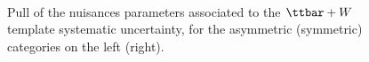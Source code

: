 \begin{figure}[tbhp]
    \caption{ Pull of the nuisances parameters associated to the $\ttbar+W$ template systematic uncertainty, 
      for the asymmetric (symmetric) categories on the left (right).
      \label{fig:nuisPull_TemplateTtw}}
  \begin{center}
     \\
  \end{center}
\end{figure}


